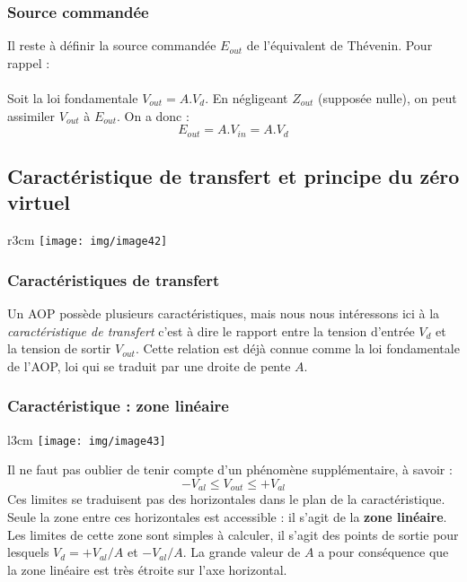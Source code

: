 
\subsubsection{Source commandée}
Il reste à définir la source commandée $E_{out}$ de l'équivalent de Thévenin. Pour rappel :\\

\ \\

Soit la loi fondamentale $V_{out} = A.V_d$. En négligeant $Z_{out}$ (supposée nulle), on peut assimiler $V_{out}$ à $E_{out}$. On a donc : 
\begin{equation}
	E_{out} = A.V_{in} = A.V_d
\end{equation}

\subsection{Caractéristique de transfert et principe du zéro virtuel}\begin{wrapfigure}[6]{r}{3cm}
\texttt{[image: img/image42]}
\end{wrapfigure}
\subsubsection{Caractéristiques de transfert}

Un AOP possède plusieurs caractéristiques, mais nous nous intéressons ici à la \textit{caractéristique de transfert} c'est à dire le rapport entre la tension d'entrée $V_d$ et la tension de sortir $V_{out}$. Cette relation est déjà connue comme la loi fondamentale de l'AOP, loi qui se traduit par une droite de pente $A$.

\subsubsection{Caractéristique : zone linéaire}
\begin{wrapfigure}[8]{l}{3cm}
	\texttt{[image: img/image43]}
\end{wrapfigure}
Il ne faut pas oublier de tenir compte d'un phénomène supplémentaire, à savoir :
\begin{equation}
	-V_{al} \leq V_{out} \leq +V_{al}
\end{equation}
Ces limites se traduisent pas des horizontales dans le plan de la caractéristique. Seule la zone entre ces horizontales est accessible : il s'agit de la \textbf{zone linéaire}.\\
Les limites de cette zone sont simples à calculer, il s'agit des points de sortie pour lesquels $V_{d} = +V_{al}/A$ et $-V_{al}/A$. La grande valeur de $A$ a pour conséquence que la zone linéaire est très étroite sur l'axe horizontal.

